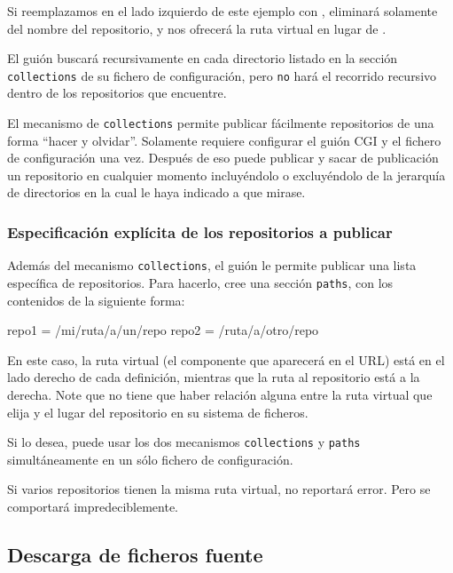 Si reemplazamos  en el lado izquierdo de este
ejemplo con ,  eliminará solamente
 del nombre del repositorio, y nos ofrecerá la ruta
virtual  en lugar de .

El guión  buscará recursivamente en cada
directorio listado en la sección \texttt{collections} de su fichero de
configuración, pero \texttt{no} hará el recorrido recursivo dentro de
los repositorios que encuentre.

El mecanismo de \texttt{collections} permite publicar fácilmente
repositorios de una forma ``hacer y olvidar''.  Solamente requiere
configurar el guión CGI y el fichero de configuración una vez.
Después de eso puede publicar y sacar de publicación un repositorio en
cualquier momento incluyéndolo o excluyéndolo de la jerarquía de
directorios en la cual le haya indicado a  que
mirase.

\subsubsection{Especificación explícita de los repositorios a publicar}

Además del mecanismo \texttt{collections}, el guión
 le permite publicar una lista específica de
repositorios.  Para hacerlo, cree una sección \texttt{paths}, con los
contenidos de la siguiente forma:
\begin{codesample2}
  [paths]
  repo1 = /mi/ruta/a/un/repo
  repo2 = /ruta/a/otro/repo
\end{codesample2}
En este caso, la ruta virtual (el componente que aparecerá en el URL)
está en el lado derecho de cada definición, mientras que la ruta al
repositorio está a la derecha.  Note que no tiene que haber relación
alguna entre la ruta virtual que elija y el lugar del repositorio en
su sistema de ficheros.

Si lo desea, puede usar los dos mecanismos \texttt{collections} y
\texttt{paths} simultáneamente en un sólo fichero de configuración.

\begin{note}
  Si varios repositorios tienen la misma ruta virtual,
   no reportará error.  Pero se comportará
  impredeciblemente.
\end{note}

\subsection{Descarga de ficheros fuente}


